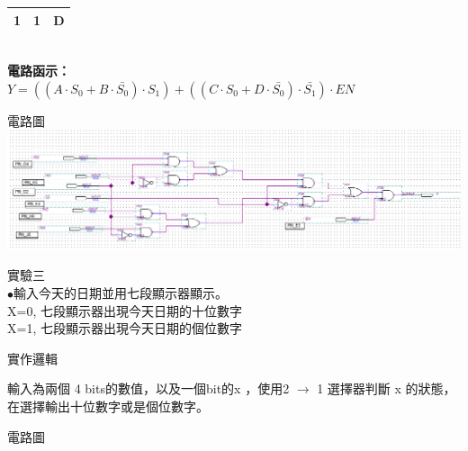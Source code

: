 \documentclass[12pt, a4paper]{article}
\begin{document}
\begin{description}
\begin{description}
\begin{description}
\begin{samepage}
\begin{table}[h]
\begin{adjustbox}{width=.3\textwidth}
\begin{tabular}{ |c c|c| }
                          1 & 1 & D \\
                          \hline
                        \end{tabular}
                      \end{adjustbox}
                    \end{table}\\
                      \bf 電路函示：\\
                      $Y = ((A\cdot S_{0} + B\cdot \bar{S_{0}})\cdot S_{1}) + ((C\cdot S_{0} + D\cdot \bar{S_{0}})\cdot \bar{S_{1}})\cdot EN$
                  \end{samepage}
                \fontsize{18pt}{20pt}
                \item[(2)] 電路圖 \\[.3cm]
                  \includegraphics[width=15cm]{./image/ex2.png} \\[.3cm]
              \end{description}
        \fontsize{20pt}{22pt}\selectfont
        \item[3.] 實驗三 \\
            \fontsize{16pt}{18pt}\selectfont
            $\bullet$輸入今天的日期並用七段顯示器顯示。 \\
            X=0, 七段顯示器出現今天日期的十位數字\\
            X=1, 七段顯示器出現今天日期的個位數字
            \normalsize
            \begin{description}
              \fontsize{18pt}{20pt}\selectfont
              \item[(1)]實作邏輯 \\
                \begin{samepage}
                  \fontsize{16pt}{18pt}\selectfont
                    輸入為兩個 4 bits的數值，以及一個bit的x ，使用2 $\rightarrow$ 1 選擇器判斷 x 的狀態，在選擇輸出十位數字或是個位數字。
                  \normalsize
                \end{samepage}
              \fontsize{18pt}{20pt}\selectfont
              \item[(2)]電路圖 \\[.2cm] 

\end{description}
\end{description}
\end{description}
\end{document}
